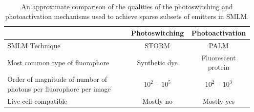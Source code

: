 \documentclass[10pt,a4paper]{book}
\begin{document}
\begin{table}
    \centering
    \begin{tabular}{ |p{4cm}|c|c| } 
        \hline
        & Photoswitching & Photoactivation \\
        \hline 
        SMLM Technique & STORM & PALM \\
        \hline
        Most common type of fluorophore & Synthetic dye & Fluorescent protein \\
        \hline
        Order of magnitude of number of photons per fluorophore per image & $10^2$ -- $10^5$ & $10^2$ -- $10^3$ \\
        \hline
        Live cell compatible & Mostly no & Mostly yes \\
        \hline
    \end{tabular}
    \caption{An approximate comparison of the qualities of the photoswitching and photoactivation mechanisms used to achieve sparse subsets of emitters in SMLM.}
    \label{table:photophysics-comparison}
\end{table}



\end{document}
